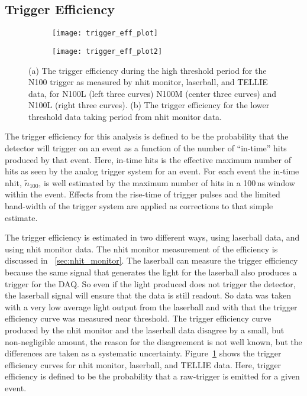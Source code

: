 \subsection{Trigger Efficiency}
\label{sec:trigeff}
\begin{figure}[htbp]
    \centering
    \begin{subfigure}{0.78\textwidth}
        \centering
    \texttt{[image: trigger\_eff\_plot]}
    \caption{}
    \end{subfigure}
    \begin{subfigure}{0.78\textwidth}
        \centering
    \texttt{[image: trigger\_eff\_plot2]}
    \end{subfigure}
    \caption[Trigger Efficiecy, Before And After Threshold Changes]{
        (a) The trigger efficiency during the high threshold period for the
        N100 trigger as measured by nhit monitor, laserball, and TELLIE data,
        for N100L (left three curves) N100M (center three curves) and N100L
        (right three curves). (b) The trigger efficiency for the lower threshold
        data taking period from nhit monitor data.}
    \label{fig:trigeff_plots}
\end{figure}

The trigger efficiency for this analysis is defined to be the probability that
the detector will trigger on an event as a function of the number of ``in-time''
hits produced by that event.
Here, in-time hits is the effective maximum number of hits as seen by the analog
trigger system for an event.
For each event the in-time nhit, $\tilde{n}_{100}$, is well
estimated by the maximum number of hits in a 100\,ns window within the event.
Effects from the rise-time of trigger pulses and the limited band-width of the
trigger system are applied as corrections to that simple estimate.

The trigger efficiency is estimated in two different ways, using laserball
data, and using nhit monitor data.
The nhit monitor measurement of the efficiency is discussed in ~\ref{sec:nhit_monitor}.
The laserball can measure the trigger efficiency because the same signal
that generates the light for the laserball also produces a trigger for
the DAQ\@.
So even if the light produced does not trigger the detector, the laserball signal
will ensure that the data is still readout.
So data was taken with a very low average light output from the laserball
and with that the trigger efficiency curve was measured near threshold.
The trigger efficiency curve produced by the nhit monitor and the laserball
data disagree by a small, but non-negligible amount, the
reason for the disagreement is not well known, but the differences are taken
as a systematic uncertainty.
Figure~\ref{fig:trigeff_plots} shows the trigger efficiency curves
for nhit monitor, laserball, and TELLIE data.
Here, trigger efficiency is defined to be the probability that a raw-trigger
is emitted for a given event.

